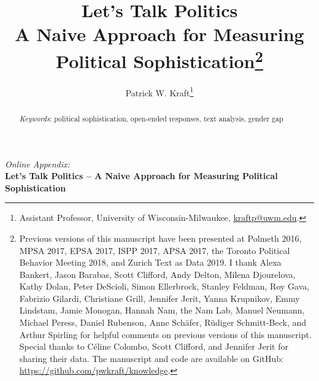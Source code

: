 \documentclass[12pt]{article}
\author{Patrick W. Kraft\footnote{Assistant Professor, University of Wisconsin-Milwaukee, \href{mailto:kraftp@uwm.edu}{kraftp@uwm.edu}.}}
\title{Let's Talk Politics\\
\large{A Naive Approach for Measuring Political Sophistication}\footnote{Previous versions of this manuscript have been presented at Polmeth 2016, MPSA 2017, EPSA 2017, ISPP 2017, APSA 2017, the Toronto Political Behavior Meeting 2018, and Zurich Text as Data 2019. I thank Alexa Bankert, Jason Barabas, Scott Clifford, Andy Delton, Milena Djourelova, Kathy Dolan, Peter DeScioli, Simon Ellerbrock, Stanley Feldman, Roy Gava, Fabrizio Gilardi, Christiane Grill, Jennifer Jerit, Yanna Krupnikov, Emmy Lindstam, Jamie Monogan, Hannah Nam, the Nam Lab, Manuel Neumann, Michael Peress, Daniel Rubenson, Anne Sch\"afer, R\"udiger Schmitt-Beck, and Arthur Spirling for helpful comments on previous versions of this manuscript. Special thanks to C{\'e}line Colombo, Scott Clifford, and Jennifer Jerit for sharing their data. The manuscript and code are available on GitHub: \url{https://github.com/pwkraft/knowledge}.}
}
\date{}
\begin{document}
\maketitle
\doublespacing
\thispagestyle{empty}


\hfill
\begin{abstract}\singlespacing
\noindent 


\vspace{\baselineskip}
\noindent \textit{Keywords}: political sophistication, open-ended responses, text analysis, gender gap

\vspace{\baselineskip}
\end{abstract}
\hfill

\newpage\setcounter{page}{1}





\clearpage
\singlespacing
\renewcommand\thesubsection{\Roman{subsection}}
\setcounter{page}{1}
\appendices
\textit{Online Appendix:}\\
\textbf{Let's Talk Politics -- A Naive Approach for Measuring Political Sophistication}

\startcontents[sections]
\clearpage


\end{document}
